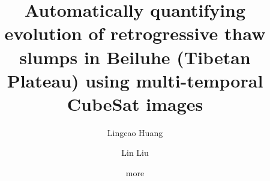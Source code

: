 \documentclass[authoryear,preprint,review,12pt]{elsarticle}
\begin{document}
\begin{frontmatter}




\title{Automatically quantifying evolution of retrogressive thaw slumps in Beiluhe (Tibetan Plateau) using multi-temporal CubeSat images}



\author[a]{Lingcao Huang}
\author[a]{Lin Liu}
\author[b]{more}



\address[a]{Earth System Science Programme, Faculty of Science, The Chinese University of Hong Kong, Hong Kong SAR, China.}
\address[b]{Add a few more co-authors?}

\begin{abstract}


\end{abstract}
\end{frontmatter}
\end{document}
